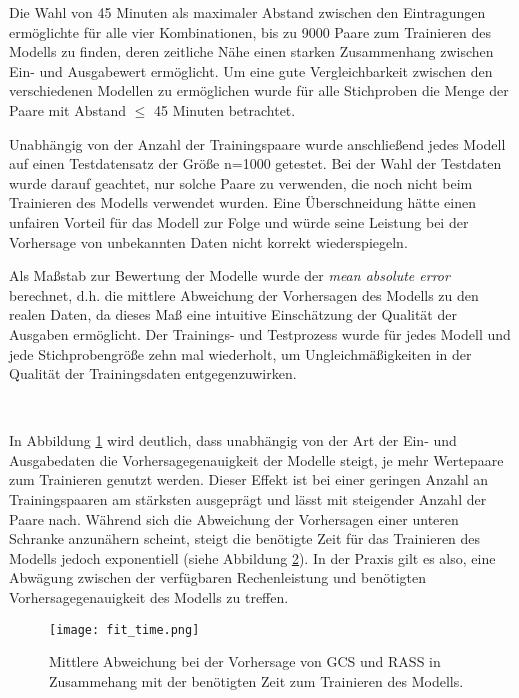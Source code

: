 Die Wahl von 45 Minuten als maximaler Abstand zwischen den Eintragungen ermöglichte für alle vier Kombinationen, bis zu 9000 Paare zum Trainieren des Modells zu finden, deren zeitliche Nähe einen starken Zusammenhang zwischen Ein- und Ausgabewert ermöglicht. Um eine gute Vergleichbarkeit zwischen den verschiedenen Modellen zu ermöglichen wurde für alle Stichproben die Menge der Paare mit Abstand $\leq$ 45 Minuten betrachtet.

Unabhängig von der Anzahl der Trainingspaare wurde anschließend jedes Modell auf einen Testdatensatz der Größe n=1000 getestet. Bei der Wahl der Testdaten wurde darauf geachtet, nur solche Paare zu verwenden, die noch nicht beim Trainieren des Modells verwendet wurden. Eine Überschneidung hätte einen unfairen Vorteil für das Modell zur Folge und würde seine Leistung bei der Vorhersage von unbekannten Daten nicht korrekt wiederspiegeln.

Als Maßstab zur Bewertung der Modelle wurde der \textit{mean absolute error} berechnet, d.h. die mittlere Abweichung der Vorhersagen des Modells zu den realen Daten, da dieses Maß eine intuitive Einschätzung der Qualität der Ausgaben ermöglicht. Der Trainings- und Testprozess wurde für jedes Modell und jede Stichprobengröße zehn mal wiederholt, um Ungleichmäßigkeiten in der Qualität der Trainingsdaten entgegenzuwirken.
 
\begin{figure}[htbp]
    \centering
     \\
    \caption{}
    \label{fig:svm_perf}
\end{figure}

In Abbildung \ref{fig:svm_perf} wird deutlich, dass unabhängig von der Art der Ein- und Ausgabedaten die Vorhersagegenauigkeit der Modelle steigt, je mehr Wertepaare zum Trainieren genutzt werden. Dieser Effekt ist bei einer geringen Anzahl an Trainingspaaren am stärksten ausgeprägt und lässt mit steigender Anzahl der Paare nach. Während sich die Abweichung der Vorhersagen einer unteren Schranke anzunähern scheint, steigt die benötigte Zeit für das Trainieren des Modells jedoch exponentiell (siehe Abbildung \ref{fig:fittime}). In der Praxis gilt es also, eine Abwägung zwischen der verfügbaren Rechenleistung und benötigten Vorhersagegenauigkeit des Modells zu treffen.
 
\begin{figure}[htb]
    \captionsetup{justification=centering}
    \centering
    \texttt{[image: fit\_time.png]}
    \caption{Mittlere Abweichung bei der Vorhersage von GCS und RASS in Zusammehang mit der benötigten Zeit zum Trainieren des Modells.}
    \label{fig:fittime}
\end{figure}

